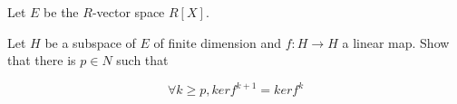 Let $E$ be the $R$-vector space $R[X]$.

Let $H$ be a subspace of $E$ of finite dimension and $f: H \to H$ a linear map. Show that there is $p \in N$ such that

\[\forall k \geq p, ker f^{k+1} = ker f^k\]